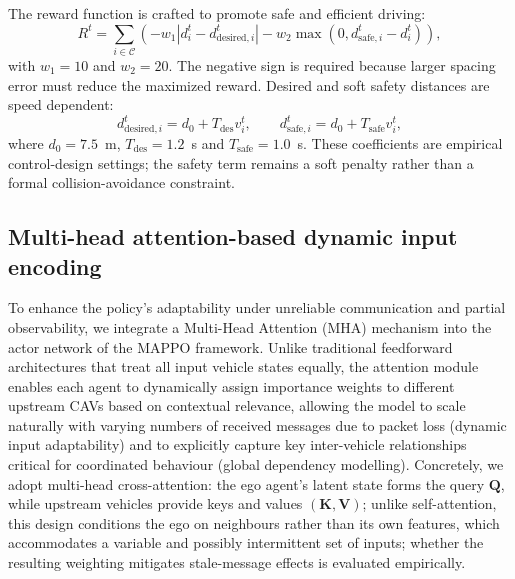 \documentclass{ieeeaccess}
\begin{document}
The reward function is crafted to promote safe and efficient driving:
\begin{equation}
R^t = \sum_{i\in\mathcal C}
\left(
-w_1 |d_i^t-d_{\mathrm{desired},i}^t|
-w_2 \max(0,d_{\mathrm{safe},i}^t-d_i^t)
\right),
\end{equation}
with $w_1=10$ and $w_2=20$. The negative sign is required because larger spacing error must reduce the maximized reward. Desired and soft safety distances are speed dependent:
\begin{equation}
d_{\mathrm{desired},i}^{t}=d_0+T_{\mathrm{des}}v_i^t,\qquad
d_{\mathrm{safe},i}^{t}=d_0+T_{\mathrm{safe}}v_i^t,
\end{equation}
where $d_0=7.5$~m, $T_{\mathrm{des}}=1.2$~s and $T_{\mathrm{safe}}=1.0$~s. These coefficients are empirical control-design settings; the safety term remains a soft penalty rather than a formal collision-avoidance constraint. %


\subsection{Multi-head attention-based dynamic input encoding}
To enhance the policy's adaptability under unreliable communication and partial observability, we integrate a Multi-Head Attention (MHA) mechanism into the actor network of the MAPPO framework. Unlike traditional feedforward architectures that treat all input vehicle states equally, the attention module enables each agent to dynamically assign importance weights to different upstream CAVs based on contextual relevance, allowing the model to scale naturally with varying numbers of received messages due to packet loss (dynamic input adaptability) and to explicitly capture key inter-vehicle relationships critical for coordinated behaviour (global dependency modelling). Concretely, we adopt multi-head cross-attention: the ego agent's latent state forms the query $\mathbf{Q}$, while upstream vehicles provide keys and values $(\mathbf{K},\mathbf{V})$; unlike self-attention, this design conditions the ego on neighbours rather than its own features, which accommodates a variable and possibly intermittent set of inputs; whether the resulting weighting mitigates stale-message effects is evaluated empirically.
\end{document}
